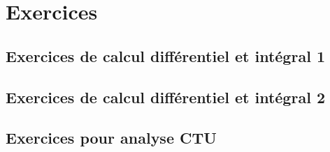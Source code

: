 \documentclass[a4paper,twoside,11pt]{book}
\begin{document}

\emptyInputPath
{}
\part{Exercices}







\chapter{Exercices de calcul différentiel et intégral 1}



\chapter{Exercices de calcul différentiel et intégral 2}




\chapter{Exercices pour analyse CTU}


{
}



\emptyInputPath
{}

\end{document}
